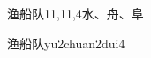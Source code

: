 \begin{entry}{渔船队}{11,11,4}{⽔、⾈、⾩}
  \begin{phonetics}{渔船队}{yu2chuan2dui4}
  \end{phonetics}
\end{entry}
